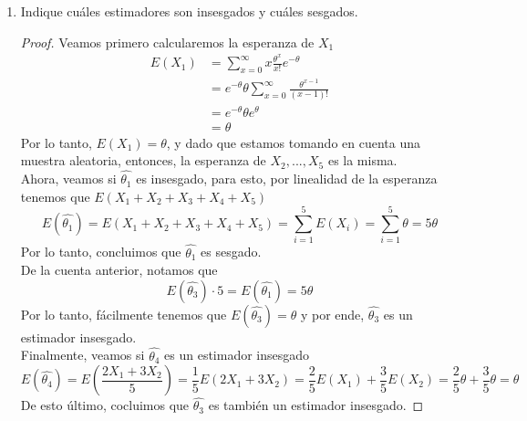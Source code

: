 \documentclass[10pt,a4paper]{article}
\theoremstyle{plain}
\theoremstyle{definition}
\theoremstyle{remark}
\newenvironment{solucion}{\renewcommand{\proofname}{Solución}\renewcommand{\qedsymbol}{}\begin{proof}}{\end{proof}}
\begin{document}
\begin{enumerate}
\begin{enumerate}
        \item Indique cuáles estimadores son insesgados y cuáles sesgados.
        \begin{solucion}
        Veamos primero calcularemos la esperanza de $X_{1}$
        \begin{equation*}
            \begin{split}
                E(X_{1}) & = \sum_{x=0}^{\infty}x\frac{\theta^x}{x!}e^{-\theta} \\
                & = e^{-\theta} \theta \sum_{x=0}^{\infty} \frac{\theta^{x-1}}{(x-1)!}\\
                & = e^{-\theta} \theta e^{\theta}\\
                & = \theta
            \end{split}
        \end{equation*}
        Por lo tanto, $E(X_1) = \theta$, y dado que estamos tomando en cuenta una muestra aleatoria, entonces, la esperanza de $X_2,...,X_5$ es la misma.\\
        Ahora, veamos si $\hat{\theta_1}$ es insesgado, para esto, por linealidad de la esperanza tenemos que $E(X_1 + X_2 + X_3 + X_4 + X_5)$
        \begin{equation*}
            E(\hat{\theta_1}) = E(X_1 + X_2 + X_3 + X_4 + X_5) = \sum_{i=1}^{5}E(X_i) = \sum_{i=1}^{5}\theta = 5 \theta
        \end{equation*}
        Por lo tanto, concluimos que $\hat{\theta_1}$ es sesgado.\\
        De la cuenta anterior, notamos que 
        \begin{equation*}
            E(\hat{\theta_3}) \cdot 5 = E(\hat{\theta_1}) = 5 \theta 
        \end{equation*}
        Por lo tanto, fácilmente tenemos que $E(\hat{\theta_3}) = \theta$ y por ende, $\hat{\theta_3}$ es un estimador insesgado.\\
        Finalmente, veamos si $\hat{\theta_4}$ es un estimador insesgado
        \begin{equation*}
            E(\hat{\theta_4}) = E\left( \frac{2X_1 + 3X_2}{5} \right) = \frac{1}{5}E(2X_1 + 3X_2) = \frac{2}{5}E(X_1) + \frac{3}{5}E(X_2) = \frac{2}{5}\theta + \frac{3}{5}\theta = \theta
        \end{equation*}
        De esto último, cocluimos que $\hat{\theta_3}$ es también un estimador insesgado.
        \end{solucion}
    \end{enumerate}
    

\end{enumerate}
\end{document}
